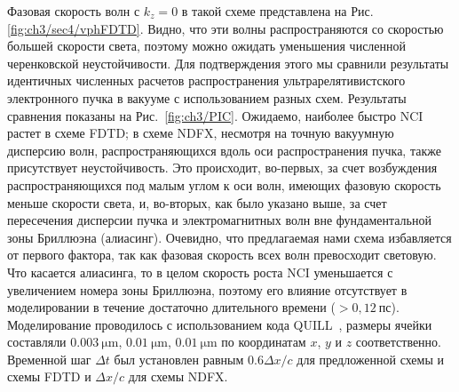 Фазовая скорость волн с $k_z=0$ в такой схеме представлена на Рис.\ref{fig:ch3/sec4/vphFDTD}.
Видно, что эти волны распространяются со скоростью большей скорости света, поэтому можно ожидать уменьшения численной черенковской неустойчивости.
Для подтверждения этого мы сравнили результаты идентичных численных расчетов распространения ультрарелятивистского электронного пучка в вакууме с использованием разных схем.
Результаты сравнения показаны на Рис.~\ref{fig:ch3/PIC}.
Ожидаемо, наиболее быстро NCI растет в схеме FDTD; в схеме NDFX, несмотря на точную вакуумную дисперсию волн, распространяющихся вдоль оси распространения пучка, также присутствует неустойчивость.
Это происходит, во-первых, за счет возбуждения распространяющихся под малым углом к оси волн, имеющих фазовую скорость меньше скорости света, и, во-вторых, как было указано выше, за счет пересечения дисперсии пучка и электромагнитных волн вне фундаментальной зоны Бриллюэна (алиасинг).
Очевидно, что предлагаемая нами схема избавляется от первого фактора, так как фазовая скорость всех волн превосходит световую.
Что касается алиасинга, то в целом скорость роста NCI уменьшается с увеличением номера зоны Бриллюэна, поэтому его влияние отсутствует в моделировании в течение достаточно длительного времени ($> 0,12\ пс$).
Моделирование проводилось с использованием кода QUILL~\cite{QUILL}, размеры ячейки составляли $\SI{0.003}{\um}$, $\SI{0.01}{\um}$, $\SI{0.01}{\um}$ по координатам $x$, $y$ и $z$ соответственно.
Временной шаг $\Delta t$ был установлен равным $0.6\Delta x/c$ для предложенной схемы и схемы FDTD и $\Delta x/c$ для схемы NDFX.





